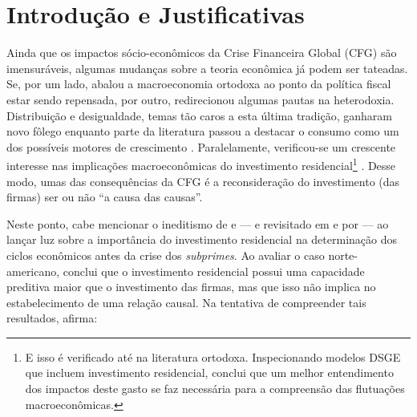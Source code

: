 \section{Introdução e Justificativas}\label{Intro}



Ainda que os impactos sócio-econômicos da Crise Financeira Global (CFG) são imensuráveis, algumas mudanças sobre a teoria econômica já podem ser tateadas. Se, por um lado, abalou a macroeconomia ortodoxa ao ponto da política fiscal estar sendo repensada, por outro, redirecionou algumas pautas na heterodoxia. Distribuição e desigualdade, temas tão caros a esta última tradição, ganharam novo fôlego \cites{carvalho_personal_2016}{ederer_will_2019} enquanto parte da literatura passou a destacar o consumo como um dos possíveis motores de crescimento \cite{brochier_macroeconomics_2017}. Paralelamente, verificou-se um crescente interesse nas implicações macroeconômicas do investimento residencial\footnote{E isso é verificado até na literatura ortodoxa. Inspecionando modelos DSGE que incluem investimento residencial, \textcite{iacoviello_housing_2010} conclui que um melhor entendimento dos impactos deste gasto se faz necessária para a compreensão das flutuações macroeconômicas. } \cite{fiebiger_semi-autonomous_2018}. Desse modo, umas das consequências da CFG é a reconsideração do investimento (das firmas) ser ou não  ``a causa das causas''.

Neste ponto, cabe mencionar o ineditismo de \textcite{green_follow_1997} e \textcite{leamer_housing_2007} --- e revisitado em \textcite{leamer_housing_2015} e por \textcite{fiebiger_trend_2017} --- ao lançar luz sobre a importância do investimento residencial na determinação dos ciclos econômicos antes da crise dos \textit{subprimes}. Ao avaliar o caso norte-americano, \textcite{green_follow_1997} conclui que o investimento residencial possui uma capacidade preditiva maior que o investimento das firmas, mas que isso não implica no estabelecimento de uma relação causal. Na tentativa de compreender tais resultados, afirma:

